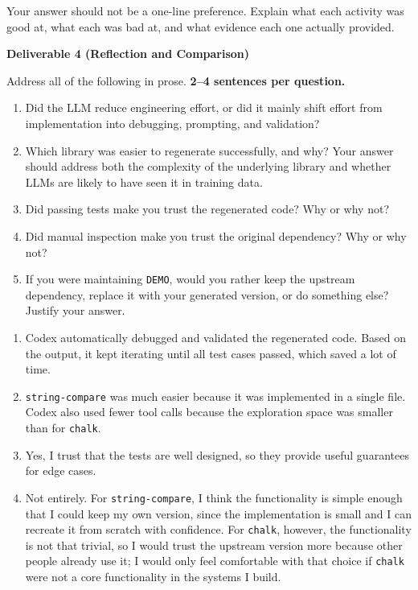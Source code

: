 Your answer should not be a one-line preference. Explain what each activity was good at,
what each was bad at, and what evidence each one actually provided.

\begin{tcolorbox}[colback=yellow!10,colframe=black,boxrule=0.5pt]
\textbf{Deliverable 4 (Reflection and Comparison)}

Address all of the following in prose. \textbf{2--4 sentences per question.}

\begin{enumerate}
    \item Did the LLM reduce engineering effort, or did it mainly shift effort from
          implementation into debugging, prompting, and validation?
    \item Which library was easier to regenerate successfully, and why?
          Your answer should address both the complexity of the underlying library
          and whether LLMs are likely to have seen it in training data.
    \item Did passing tests make you trust the regenerated code? Why or why not?
    \item Did manual inspection make you trust the original dependency? Why or why not?
    \item If you were maintaining \texttt{DEMO}, would you rather keep the upstream
          dependency, replace it with your generated version, or do something else?
          Justify your answer.
\end{enumerate}
\end{tcolorbox}

\begin{tcolorbox}[colback=blue!10,colframe=blue!70!black,boxrule=0.5pt]
\begin{enumerate}
    \item Codex automatically debugged and validated the regenerated code. Based on the output, it kept iterating until all test cases passed, which saved a lot of time.
    \item \texttt{string-compare} was much easier because it was implemented in a single file. Codex also used fewer tool calls because the exploration space was smaller than for \texttt{chalk}.
    \item Yes, I trust that the tests are well designed, so they provide useful guarantees for edge cases.
    \item Not entirely. For \texttt{string-compare}, I think the functionality is simple enough that I could keep my own version, since the implementation is small and I can recreate it from scratch with confidence. For \texttt{chalk}, however, the functionality is not that trivial, so I would trust the upstream version more because other people already use it; I would only feel comfortable with that choice if \texttt{chalk} were not a core functionality in the systems I build.
\end{enumerate}
\end{tcolorbox}
